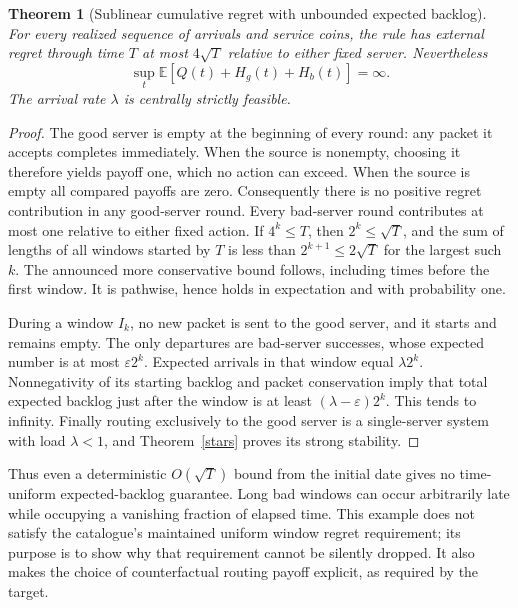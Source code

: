 \documentclass[11pt]{article}
\newtheorem{theorem}{Theorem}
\theoremstyle{definition}
\newcommand{\E}{\mathbb E}
\begin{document}
\begin{theorem}[Sublinear cumulative regret with unbounded expected backlog]
For every realized sequence of arrivals and service coins, the rule has
external regret through time $T$ at most $4\sqrt T$ relative to either
fixed server. Nevertheless
\[
 \sup_t\E[Q(t)+H_g(t)+H_b(t)]=\infty.
\]
The arrival rate $\lambda$ is centrally strictly feasible.
\end{theorem}
\begin{proof}
The good server is empty at the beginning of every round: any packet it
accepts completes immediately. When the source is nonempty, choosing it
therefore yields payoff one, which no action can exceed. When the source
is empty all compared payoffs are zero. Consequently there is no positive
regret contribution in any good-server round. Every bad-server round
contributes at most one relative to either fixed action. If $4^k\le T$,
then $2^k\le\sqrt T$, and the sum of lengths of all windows started by
$T$ is less than $2^{k+1}\le2\sqrt T$ for the largest such $k$.
The announced more conservative bound follows, including times before
the first window. It is pathwise, hence holds in expectation and with
probability one.

During a window $I_k$, no new packet is sent to the good server, and it
starts and remains empty. The only departures are bad-server successes,
whose expected number is at most $\varepsilon 2^k$. Expected arrivals
in that window equal $\lambda 2^k$. Nonnegativity of its starting backlog
and packet conservation imply that total expected backlog just after the
window is at least $(\lambda-\varepsilon)2^k$. This tends to infinity.
Finally routing exclusively to the good server is a single-server system
with load $\lambda<1$, and Theorem~\ref{stars} proves its strong stability.
\end{proof}
Thus even a deterministic $O(\sqrt T)$ bound from the initial date gives
no time-uniform expected-backlog guarantee. Long bad windows can occur
arbitrarily late while occupying a vanishing fraction of elapsed time.
This example does not satisfy the catalogue's maintained uniform window
regret requirement; its purpose is to show why that requirement cannot
be silently dropped. It also makes the choice of counterfactual routing
payoff explicit, as required by the target.
\end{document}

